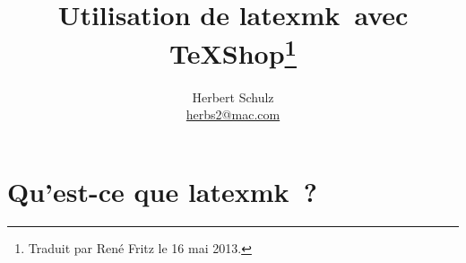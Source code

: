 \documentclass[11pt,french]{article}
\newcommand{\TS}{\textsf{\TeX Shop}}
\newcommand{\latexmk}{\textsf{latexmk}}
\newcommand{\cmd}[1]{\textsf{#1}}
\begin{document}
\title{Utilisation de \latexmk\ avec \TS\thanks{Traduit par René Fritz le 16 mai 2013.}}
\author{Herbert Schulz\\\small\href{mailto:herbs2@mac.com}{herbs2@mac.com}}
\date{}


\maketitle
\thispagestyle{empty}

\section{Qu'est-ce que \latexmk\ ?}

\end{document}
